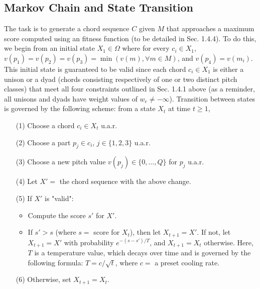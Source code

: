 \documentclass[twoside]{article}
\begin{document}
	\subsection{Markov Chain and State Transition}
	The task is to generate a chord sequence $C$ given $M$ that approaches a maximum score computed using an fitness function (to be detailed in Sec. 1.4.4). To do this, we begin from an initial state $X_1 \in \Omega$ where for every $c_i \in X_1$, $v(p_1)=v(p_2)=v(p_3)=\min(v(m), \forall m \in M)$, and $v(p_4)=v(m_i)$. This initial state is guaranteed to be valid since each chord $c_i \in X_1$ is either a unison or a dyad (chords consisting respectively of one or two distinct pitch classes) that meet all four constraints outlined in Sec. 1.4.1 above (as a reminder, all unisons and dyads have weight values of $w_e \neq -\infty$). Transition between states is governed by the following scheme: from a state $X_t$ at time $t \geq 1$,
	\begin{enumerate}
		\item[(1)]
		Choose a chord $c_i \in X_t$ u.a.r.
		\item[(2)]
		Choose a part $p_j \in c_i$, $j \in \{1,2,3\}$ u.a.r.
		\item[(3)]
		Choose a new pitch value $v(p_j) \in \{0,...,Q\}$ for $p_j$ u.a.r.
		\item[(4)]
		Let $X'=$ the chord sequence with the above change.
		\item[(5)]
		If $X'$ is "valid":
		\begin{itemize}
			\item 
			Compute the score $s'$ for $X'$. 
			\item 
			If $s' > s$ (where $s=$ score for $X_t$), then let $X_{t+1} = X'$. If not, let $X_{t+1} = X'$ with probability $e^{-(s - s')/T}$, and $X_{t+1} = X_t$ otherwise. Here, $T$ is a temperature value, which decays over time and is governed by the following formula: $T = c / \sqrt{t}$, where $c=$ a preset cooling rate.
		\end{itemize}
	\item[(6)]
	Otherwise, set $X_{t+1} = X_t$.
	\end{enumerate}
\end{document}
